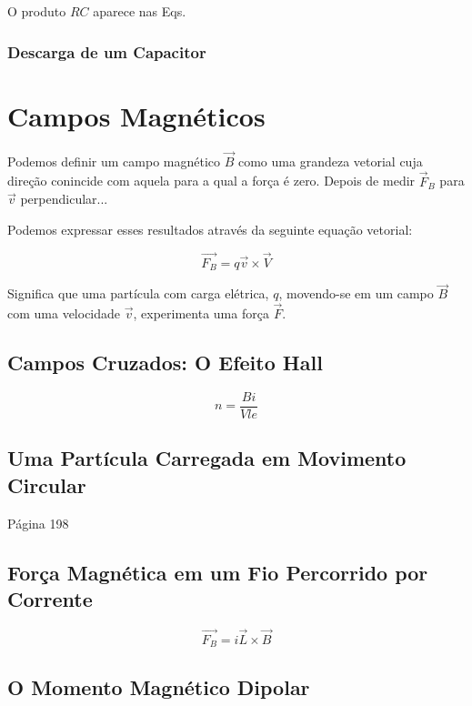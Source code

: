 O produto $RC$ aparece nas Eqs.

\subsubsection{Descarga de um Capacitor}

\section{Campos Magnéticos}
Podemos definir um campo magnético $\vec{B}$ como uma grandeza vetorial cuja direção conincide com aquela para a qual a força é zero. Depois de medir $\vec{F}_B$ para $\vec{v}$ perpendicular...

Podemos expressar esses resultados através da seguinte equação vetorial:

\begin{equation}\label{18.34}
    \vec{F_B}=q\vec{v}\times\vec{V}
\end{equation}

Significa que uma partícula com carga elétrica, $q$, movendo-se em um campo $\vec{B}$ com uma velocidade $\vec{v}$, experimenta uma força $\vec{F}$.

\subsection{Campos Cruzados: O Efeito Hall}

\begin{equation}
    n=\dfrac{Bi}{Vle}
\end{equation}

\subsection{Uma Partícula Carregada em Movimento Circular}

Página 198

\subsection{Força Magnética em um Fio Percorrido por Corrente}

\begin{equation}
    \vec{F_B}=i\vec{L}\times \vec{B}
\end{equation}

\subsection{O Momento Magnético Dipolar}

